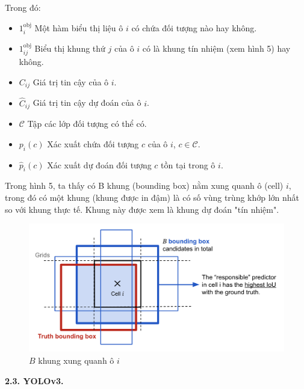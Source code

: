 \documentclass{report}
\begin{document}
\bigskip
Trong đó:
\begin{itemize}
	\item ${1}_i^\text{obj}$ Một hàm biểu thị liệu ô $i$ có chứa đối tượng nào hay không.
	\vspace{-0.2cm}
	\item ${1}_{ij}^\text{obj}$ Biểu thị khung thứ $j$ của ô $i$ có là khung tín nhiệm (xem hình 5) hay không.
	\vspace{-0.2cm}
	\item $C_{ij}$ Giá trị tin cậy của ô $i$.
	\vspace{-0.2cm}
	\item $\hat{C}_{ij}$ Giá trị tin cậy dự đoán của ô $i$.
	\vspace{-0.2cm}
	\item $\mathcal{C}$ Tập các lớp đối tượng có thể có.
	\vspace{-0.2cm}
	\item $p_i(c)$ Xác xuất chứa đối tượng $c$ của ô $i$, $c \in \mathcal{C}$.
	\vspace{-0.2cm}
	\item $\hat{p}_i(c)$ Xác xuất dự đoán đối tượng $c$ tồn tại trong ô $i$. 
\end{itemize}

\smallskip
Trong hình 5, ta thấy có B khung (bounding box) nằm xung quanh ô (cell) $i$, trong đó có một khung (khung được in đậm) là có số vùng trùng khớp lớn nhất so với khung thực tế. Khung này được xem là khung dự đoán "tín nhiệm".

\begin{figure}[h!]
	\includegraphics[scale=0.41]{yolobb.png}
	\caption{$B$ khung xung quanh ô $i$}
\end{figure}

\bigskip
\changefontsizes{14pt}
\setlength{\parindent}{0.0cm}
\textbf{2.3. YOLOv3.}
\end{document}
